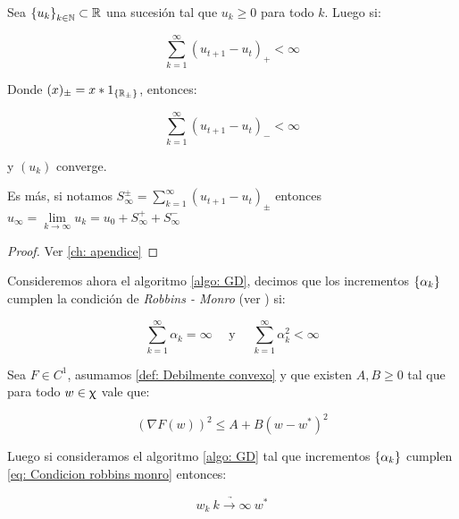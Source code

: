 \begin{lemma}
	\label{lemma: Convergencia de sucesiones positivas acotadas sumables}
	Sea $\left\lbrace u_k\right\rbrace_{k \in {\mathbb{N}}} \subset {\mathbb{R}}$ una sucesi\'on tal que $u_k \geq 0$ para todo $k$. Luego si:
	
	\begin{equation*}
		\sum\limits_{k=1}^{\infty} {\left(u_{t+1} - u_t\right)_{+}} < \infty
	\end{equation*}
	
	Donde $(x)_{\pm} = x * 1_{\left\lbrace{\mathbb{R}}_{\pm}\right\rbrace}$, entonces:
	
	\begin{equation*}
		\sum\limits_{k=1}^{\infty} {\left(u_{t+1} - u_t\right)_{-}} < \infty
	\end{equation*}
	
	 y $\left(u_k\right)$ converge. 
	 
	 Es m\'as, si notamos $S^{\pm}_{\infty} = \sum\limits_{k=1}^{\infty}  {\left(u_{t+1} - u_t\right)_{\pm}} $ entonces $u_{\infty} = \lim\limits_{k \rightarrow \infty} {u_k} = u_0 + S_{\infty}^+ + S_{\infty}^-$
\end{lemma}

\begin{proof}
	Ver \ref{ch: apendice}
\end{proof}

Consideremos ahora el algoritmo \ref{algo: GD}, decimos que los incrementos $\left\lbrace\alpha_k\right\rbrace$  cumplen la condici\'on de \textit{Robbins - Monro} (ver \cite{robbins:1951}) si:

\begin{equation}
\label{eq: Condicion robbins monro}
\sum\limits_{k=1}^{\infty} {\alpha_k} = \infty \quad \text{ y } \quad \sum\limits_{k=1}^{\infty} {\alpha_k^2} < \infty
\end{equation}

\begin{theorem}
	\label{theorem: convergencia puntual batch, objetivo debilmente convexo, incrementos decrecientes}
	Sea $F \in C^1$, asumamos \ref{def: Debilmente convexo} y que existen $A,B \geq 0$ tal que para todo $w \in \upchi$ vale que:
	
	\begin{equation}
	\label{eq: Condicion gradiente acotado, ctp, batch}
		\left(\nabla F(w)\right)^2 \leq A + B \left(w - w^*\right)^2
	\end{equation}
	
	Luego si consideramos el algoritmo \ref{algo: GD} tal que incrementos $\left\lbrace\alpha_k\right\rbrace$  cumplen \ref{eq: Condicion robbins monro} entonces:
	
	\begin{equation}
		w_k \ \underrightarrow{k \rightarrow \infty} \ w^*
	\end{equation}
	
\end{theorem}

